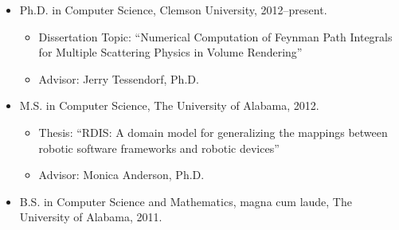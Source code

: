 \begin{itemize}[leftmargin=*]
  \item Ph.D. in Computer Science, Clemson University, 2012--present.
  \begin{itemize}
    \item Dissertation Topic:
          ``Numerical Computation of Feynman Path Integrals for Multiple
            Scattering Physics in Volume Rendering''
    \item Advisor: Jerry Tessendorf, Ph.D.
  \end{itemize}

  \item M.S. in Computer Science, The University of Alabama, 2012.
  \begin{itemize}
    \item Thesis: ``RDIS: A domain model for generalizing the mappings between
                    robotic software frameworks and robotic devices''
    \item Advisor: Monica Anderson, Ph.D.
  \end{itemize}

  \item B.S. in Computer Science and Mathematics, magna cum laude, The
        University of Alabama, 2011.
\end{itemize}

